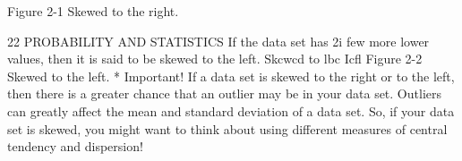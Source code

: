 Figure 2-1
Skewed to the right.



22 PROBABILITY AND STATISTICS
If the data set has 2i few more lower values, then it is said to be skewed
to the left.
Skcwcd to
lbc Icﬂ
Figure 2-2
Skewed to the left.
* Important!
If a data set is skewed to the right or to the left, then there
is a greater chance that an outlier may be in your data set.
Outliers can greatly affect the mean and standard deviation
of a data set. So, if your data set is skewed, you might want
to think about using different measures of central tendency
and dispersion!


